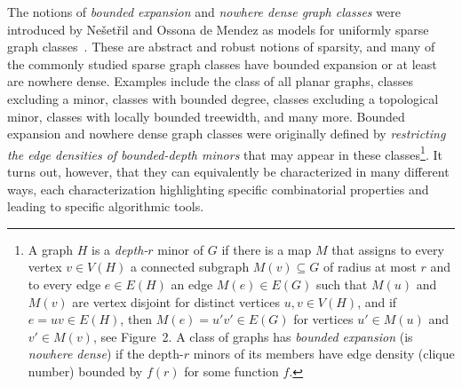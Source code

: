 \documentclass[1p,number,a4paper]{elsarticle}
\theoremstyle{remark}
\begin{document}
The notions of \emph{bounded expansion} and \emph{nowhere dense graph classes} 
were introduced by Ne\v{s}et\v{r}il and Ossona de Mendez as models 
for uniformly sparse graph classes~\cite{Taxi_stoc06,nevsetvril2011nowhere}. 
These are abstract and robust notions of sparsity, 
and many of the commonly studied sparse graph classes have bounded
expansion or at least are nowhere dense. Examples include the class of all planar
graphs, classes excluding a minor, classes with bounded degree, classes excluding a topological minor, classes with locally bounded treewidth, and many more. Bounded expansion and nowhere dense graph classes were originally defined by \emph{restricting the edge densities of 
bounded-depth minors} that may appear in these classes\footnote{A graph $H$ is a \emph{depth-$r$} minor of $G$ if there is 
a map $M$ that assigns to every vertex $v\in V(H)$ a
connected subgraph $M(v) \subseteq G$ of radius at most $r$ and to every edge
$e\in E(H)$ an edge  $M(e)\in E(G)$ such that
$M(u)$ and $M(v)$ are vertex disjoint for distinct vertices $u,v\in V(H)$, and
if $e = uv \in E(H)$, then $M(e) = u'v'\in E(G)$ for 
  vertices $u'\in M(u)$ and $v'\in M(v)$, see Figure~2.
A class of graphs has \emph{bounded expansion} (is \emph{nowhere dense}) if the depth-$r$ minors of its members have edge density (clique number) bounded by $f(r)$ for some function $f$.}. It turns out, however,
that they can equivalently be characterized in many different ways, 
each characterization highlighting specific combinatorial properties and 
leading to specific algorithmic tools. 
\end{document}
